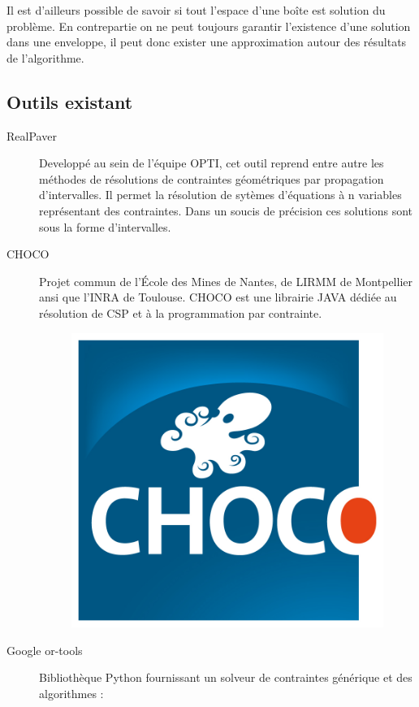  Il est d'ailleurs possible de savoir si tout l'espace d'une boîte est solution du problème. En contrepartie on ne peut toujours garantir l'existence d'une solution dans une enveloppe, il peut donc exister une approximation autour des résultats de l'algorithme. 
 \clearpage
 
 \subsection{Outils existant}
\begin{description}
 \item [RealPaver]\label{realp}
Developpé  au sein de l'équipe \textsc{OPTI}, cet outil reprend entre autre les méthodes de résolutions de contraintes géométriques par propagation d'intervalles. Il permet la résolution de sytèmes d'équations à n variables représentant des contraintes. Dans un soucis de précision ces solutions sont sous la forme d'intervalles. \cite{realpaver}
\item [CHOCO]  Projet commun  de l'École des Mines de Nantes, de \textsc{LIRMM} de Montpellier ansi que l'INRA de Toulouse. \textsc{CHOCO} est une librairie  \textsc{JAVA}  dédiée au résolution de \textsc{CSP} et à la programmation par contrainte. \cite{choco}
 \begin{figure}[h] %
  \center
\includegraphics[scale=0.50]{img/choco}
\end{figure} %


\item [Google or-tools]
 Bibliothèque Python fournissant un solveur de contraintes générique et des algorithmes : \cite{ortools}



\end{description}
